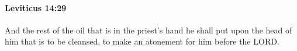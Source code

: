 
		\paragraph{Leviticus 14:29} %
			\label{LEVITICUS-14-29}

			And the rest of the oil that is in the priest’s hand he shall put upon the head of him that is to be cleansed, to make an atonement for him before the LORD.


